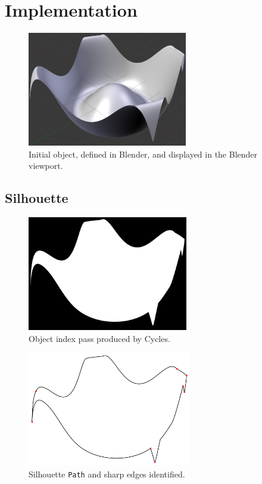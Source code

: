 \chapter{Implementation}\label{appendix_implementation}
\begin{figure}[h!]
	\centering
	\includegraphics[height=5cm]{images/sil_viewport.png}
	\caption{Initial object, defined in Blender, and displayed in the Blender viewport.}\label{sil_viewport}
\end{figure}

\FloatBarrier
\section{Silhouette}
\begin{figure}[h!]
	\centering
	\includegraphics[height=5cm]{images/sil_obj.png}
	\caption{Object index pass produced by Cycles.}\label{sil_obj}
\end{figure}

\begin{figure}[h!]
	\centering
	\includegraphics[height=5cm]{images/sil_path_corners.png}
	\caption{Silhouette \texttt{Path} and sharp edges identified.}\label{sil_path_corners}
\end{figure}


